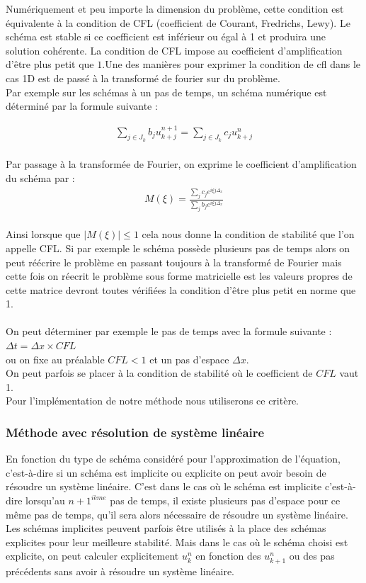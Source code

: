 \documentclass[12pt]{article}
\begin{document}
\noindent Numériquement et peu importe la dimension du problème, cette condition est équivalente à la condition de CFL \cite{ref9} (coefficient de Courant, Fredrichs, Lewy).
Le schéma est stable si ce coefficient est inférieur ou égal à 1 et produira une solution cohérente. 
La condition de CFL impose au coefficient d'amplification d'être plus petit que $1$.Une des manières pour exprimer la condition de cfl dans le cas 1D est de passé à la transformé de fourier sur du problème.
\\Par exemple sur les schémas à un pas de temps, un schéma numérique est déterminé par la formule suivante :

\begin{eqnarray*}
    \sum_{j\in J_k} b_ju_{k+j}^{n+1} = \sum_{j\in J_k} c_ju_{k+j}^{n} 
\end{eqnarray*}
\\Par passage à la transformée de Fourier, on exprime le coefficient d'amplification du schéma par :
\begin{eqnarray*}
     M(\xi)=\frac{\sum_j c_j e^{i\xi j \Delta_x}}{\sum_j b_j e^{i \xi j\Delta_x }}
\end{eqnarray*}
\\Ainsi lorsque que $|M(\xi)|\leq 1$ cela nous donne la condition de stabilité que l'on appelle CFL. Si par exemple le schéma possède plusieurs pas de temps alors on peut réécrire le problème en passant toujours à la transformé de Fourier mais cette fois on réecrit le problème sous forme matricielle est les valeurs propres de cette matrice devront toutes vérifiées la condition d'être plus petit en norme que 1.
\\
\\
On peut déterminer par exemple le pas de temps avec la formule suivante :
$\Delta t = \Delta x \times CFL$
\\ou on fixe au préalable $CFL < 1$ et un pas d'espace $\Delta x$.
\\On peut parfois se placer à la condition de stabilité où le coefficient de $CFL$ vaut 1.
\\Pour l'implémentation de notre méthode nous utiliserons ce critère.
\\
\subsubsection{Méthode avec résolution de système linéaire}\noindent En fonction du type de schéma considéré pour l'approximation de l'équation,  c'est-à-dire si un schéma est implicite ou explicite on peut avoir besoin de résoudre un système linéaire. C'est dans le cas où le schéma est implicite c'est-à-dire lorsqu'au $n+1^{ième}$ pas de temps, il existe plusieurs pas d'espace pour ce même pas de temps, qu'il sera alors nécessaire de résoudre un système linéaire.
Les schémas implicites peuvent parfois être utilisés à la place des schémas explicites pour leur meilleure stabilité. 
Mais dans le cas où le schéma choisi est explicite, on peut calculer explicitement $u_k^n$ en fonction des $u_{k+1}^{n}$ ou des pas précédents sans avoir à résoudre un système linéaire.
\end{document}
